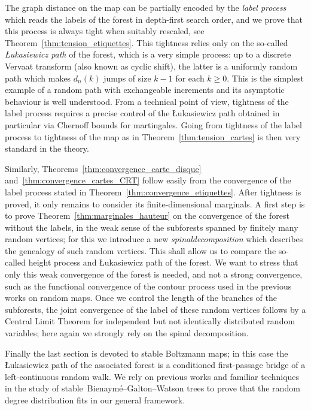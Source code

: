 \documentclass[AHL,Unicode,longabstracts,published]{cedram}
\newcommand{\1}{\ensembles{1}}
\renewcommand{\ge}{\geqslant}
\begin{document}
The graph distance on the map can be partially encoded by the \emph{label process} which reads the labels of the forest in depth-first search order, and we prove that this process is always tight when suitably rescaled, see Theorem~\ref{thm:tension_etiquettes}. This tightness relies only on the so-called \emph{{\L}ukasiewicz path} of the forest, which is a very simple process: up to a discrete Vervaat transform (also known as cyclic shift), the latter is a uniformly random path which makes $d_n(k)$ jumps of size $k-1$ for each $k \ge 0$. This is the simplest example of a random path with exchangeable increments and its asymptotic behaviour is well understood. From a technical point of view, tightness of the label process requires a precise control of the {\L}ukasiewicz path obtained in particular via Chernoff bounds for martingales. Going from tightness of the label process to tightness of the map as in Theorem~\ref{thm:tension_cartes} is then very standard in the theory.

Similarly, Theorems~\ref{thm:convergence_carte_disque} and~\ref{thm:convergence_cartes_CRT} follow easily from the convergence of the label process stated in Theorem~\ref{thm:convergence_etiquettes}. After tightness is proved, it only remains to consider its finite-dimensional marginals. A first step is to prove Theorem~\ref{thm:marginales_hauteur} on the convergence of the forest without the labels, in the weak sense of the subforests spanned by finitely many random vertices; for this we introduce a new \emph{spinal\linebreak decomposition} which describes the genealogy of such random vertices. This shall allow us to compare the so-called height process and {\L}ukasiewicz path of the forest. We want to stress that only this weak convergence of the forest is needed, and not a strong convergence, such as the functional convergence of the contour process used in the previous works on random maps. Once we control the length of the branches of the subforests, the joint convergence of the label of these random vertices follows by a Central Limit Theorem for independent but not identically distributed random variables; here again we strongly rely on the spinal decomposition.

Finally the last section is devoted to stable Boltzmann maps; in this case the {\L}ukasiewicz path of the associated forest is a conditioned first-passage bridge of a left-continuous random walk. We rely on previous works and familiar techniques in the study of stable~Bienaymé--Galton--Watson trees to prove that the random degree distribution fits in our general framework.
\end{document}
